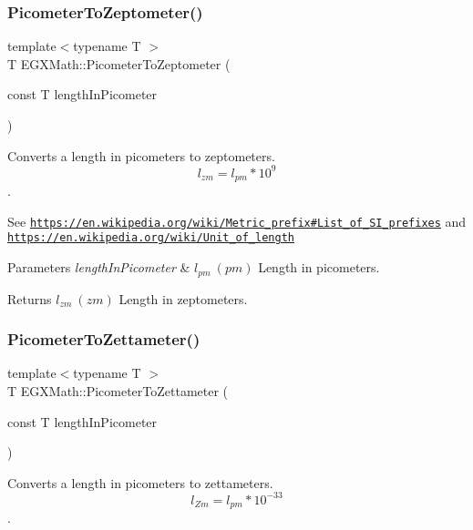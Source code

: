 \subsubsection{\texorpdfstring{Picometer\+To\+Zeptometer()}{PicometerToZeptometer()}}
{\footnotesize\ttfamily template$<$typename T $>$ \\
T E\+G\+X\+Math\+::\+Picometer\+To\+Zeptometer (\begin{DoxyParamCaption}\item[{const T}]{length\+In\+Picometer }\end{DoxyParamCaption})}



Converts a length in picometers to zeptometers. \[ l_{zm}=l_{pm} * 10^{9} \]. 

See \href{https://en.wikipedia.org/wiki/Metric_prefix#List_of_SI_prefixes}{\tt https\+://en.\+wikipedia.\+org/wiki/\+Metric\+\_\+prefix\#\+List\+\_\+of\+\_\+\+S\+I\+\_\+prefixes} and \href{https://en.wikipedia.org/wiki/Unit_of_length}{\tt https\+://en.\+wikipedia.\+org/wiki/\+Unit\+\_\+of\+\_\+length} 
\begin{DoxyParams}{Parameters}
{\em length\+In\+Picometer} & $ l_{pm}\ (pm)$ Length in picometers. \\
\hline
\end{DoxyParams}
\begin{DoxyReturn}{Returns}
$ l_{zm}\ (zm)$ Length in zeptometers. 
\end{DoxyReturn}
\mbox{\label{group___e_g_x_math-_conversions-_length_conversions-_picometer-_s_i_gae3d104d5bddc3f76d951fb0c86aa31ca}} 
\subsubsection{\texorpdfstring{Picometer\+To\+Zettameter()}{PicometerToZettameter()}}
{\footnotesize\ttfamily template$<$typename T $>$ \\
T E\+G\+X\+Math\+::\+Picometer\+To\+Zettameter (\begin{DoxyParamCaption}\item[{const T}]{length\+In\+Picometer }\end{DoxyParamCaption})}



Converts a length in picometers to zettameters. \[ l_{Zm}=l_{pm} * 10^{-33} \]. 

